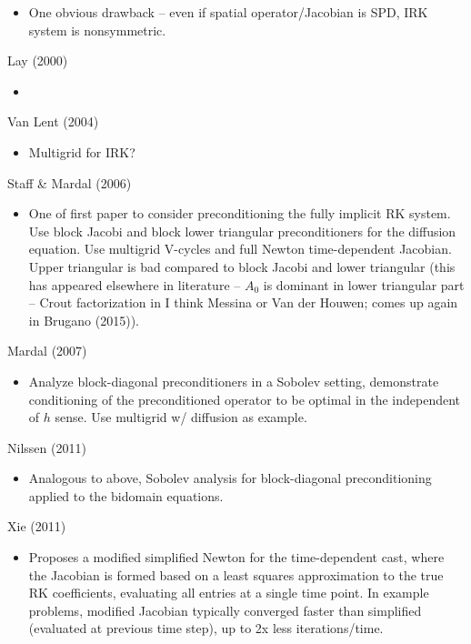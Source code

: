 \documentclass[a4paper,10pt]{article}
\begin{document}
\begin{itemize}
	\item One obvious drawback -- even if spatial operator/Jacobian is SPD, IRK system is
	nonsymmetric.
\end{itemize}

Lay (2000)
\begin{itemize}
	\item 
\end{itemize}

Van Lent (2004)
\begin{itemize}
	\item Multigrid for IRK?
\end{itemize}

Staff \& Mardal (2006)
\begin{itemize}
	\item One of first paper to consider preconditioning the fully implicit RK system.
	Use block Jacobi and block lower triangular preconditioners for the diffusion equation.
	Use multigrid V-cycles and full Newton time-dependent Jacobian. Upper triangular is
	bad compared to block Jacobi and lower triangular (this has appeared elsewhere in
	literature -- $A_0$ is dominant in lower triangular part -- Crout factorization
	in I think Messina or Van der Houwen; comes up again in Brugano (2015)).
\end{itemize}
Mardal (2007)
\begin{itemize}
	\item Analyze block-diagonal preconditioners in a Sobolev setting, demonstrate
	conditioning of the preconditioned operator to be optimal in the independent of
	$h$ sense. Use multigrid w/ diffusion as example. 
\end{itemize}
Nilssen (2011)
\begin{itemize}
	\item Analogous to above, Sobolev analysis for block-diagonal preconditioning
	applied to the bidomain equations.
\end{itemize}

Xie (2011)
\begin{itemize}
	\item Proposes a modified simplified Newton for the time-dependent cast, where the Jacobian is
	formed based on a least squares approximation to the true RK coefficients, evaluating all entries
	at a single time point. In example problems, modified Jacobian typically converged faster
	than simplified (evaluated at previous time step), up to 2x less iterations/time. 
\end{itemize}
\end{document}
